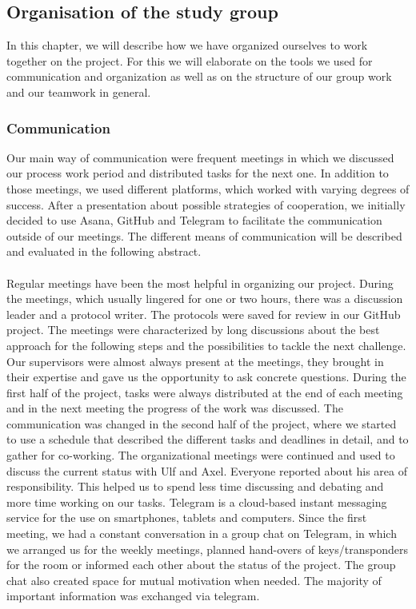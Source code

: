 \subsection{Organisation of the study group}

In this chapter, we will describe how we have organized ourselves to work together on the project. For this we will elaborate on the tools we used for communication and organization as well as on the structure of our group work and our teamwork in general.


\subsubsection{Communication}

Our main way of communication were frequent meetings in which we discussed our process work period and distributed tasks for the next one. In addition to those meetings, we used different platforms, which worked with varying degrees of success. After a presentation about possible strategies of cooperation, we initially decided to use Asana, GitHub and Telegram to facilitate the communication outside of our meetings. The different means of communication will be described and evaluated in the following abstract. \\
\\
Regular meetings have been the most helpful in organizing our project. During the meetings, which usually lingered for one or two hours, there was a discussion leader and a protocol writer. The protocols were saved for review in our GitHub project. The meetings were characterized by long discussions about the best approach for the following steps and the possibilities to tackle the next challenge. Our supervisors were almost always present at the meetings, they brought in their expertise and gave us the opportunity to ask concrete questions. During the first half of the project, tasks were always distributed at the end of each meeting and in the next meeting the progress of the work was discussed. The communication was changed in the second half of the project,  where we started to use a schedule that described the different tasks and deadlines in detail, and to gather for co-working. The organizational meetings were continued and used to discuss the current status with Ulf and Axel. Everyone reported about his area of responsibility. This helped us to spend less time discussing and debating and more time working on our tasks.
Telegram is a cloud-based instant messaging service for the use on smartphones, tablets and computers. Since the first meeting, we had a constant conversation in a group chat on Telegram, in which we arranged us for the weekly meetings, planned hand-overs of keys/transponders for the room or informed each other about the status of the project. The group chat also created space for mutual motivation when needed. The majority of important information was exchanged via telegram. \\

